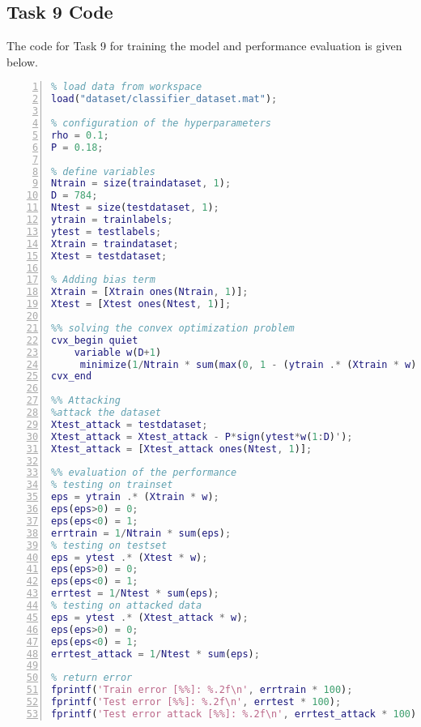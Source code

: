 \documentclass[a4paper,12pt]{report}
\begin{document}
\subsection{Task 9 Code}
The code for Task 9 for training the model and performance evaluation is given below.
\begin{lstlisting}[language=Matlab, style=Matlab-editor, frame=single, numbers=left]
%% setup the data
% load data from workspace
load("dataset/classifier_dataset.mat");

% configuration of the hyperparameters
rho = 0.1;
P = 0.18;

% define variables
Ntrain = size(traindataset, 1); 
D = 784;
Ntest = size(testdataset, 1);
ytrain = trainlabels;
ytest = testlabels;
Xtrain = traindataset; 
Xtest = testdataset;

% Adding bias term 
Xtrain = [Xtrain ones(Ntrain, 1)];
Xtest = [Xtest ones(Ntest, 1)];

%% solving the convex optimization problem
cvx_begin quiet
    variable w(D+1)  
     minimize(1/Ntrain * sum(max(0, 1 - (ytrain .* (Xtrain * w) - P * abs(ytrain)*abs(w(1:D)')*ones(D,1)))) + rho * square_pos(norm(w(1:D))));  
cvx_end

%% Attacking
%attack the dataset
Xtest_attack = testdataset;
Xtest_attack = Xtest_attack - P*sign(ytest*w(1:D)');
Xtest_attack = [Xtest_attack ones(Ntest, 1)];

%% evaluation of the performance
% testing on trainset
eps = ytrain .* (Xtrain * w);
eps(eps>0) = 0; 
eps(eps<0) = 1; 
errtrain = 1/Ntrain * sum(eps);
% testing on testset
eps = ytest .* (Xtest * w);
eps(eps>0) = 0;
eps(eps<0) = 1; 
errtest = 1/Ntest * sum(eps);
% testing on attacked data
eps = ytest .* (Xtest_attack * w);
eps(eps>0) = 0;
eps(eps<0) = 1; 
errtest_attack = 1/Ntest * sum(eps);

% return error 
fprintf('Train error [%%]: %.2f\n', errtrain * 100);
fprintf('Test error [%%]: %.2f\n', errtest * 100);
fprintf('Test error attack [%%]: %.2f\n', errtest_attack * 100);
\end{lstlisting}
\end{document}

